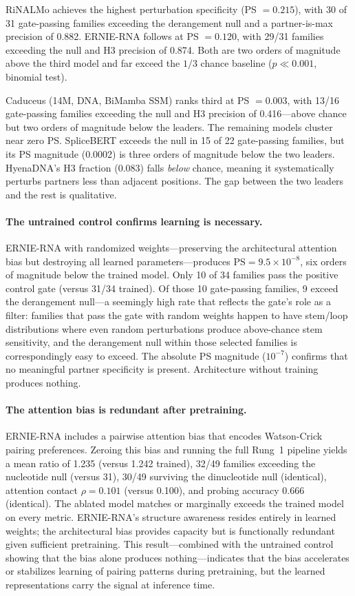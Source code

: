 \documentclass[11pt]{article}
\begin{document}
RiNALMo achieves the highest perturbation specificity (PS $= 0.215$),
with 30 of 31 gate-passing families exceeding the derangement null
and a partner-is-max precision of 0.882.
ERNIE-RNA follows at PS $= 0.120$, with 29/31 families exceeding the
null and H3 precision of 0.874. Both are two orders
of magnitude above the third model and far exceed the
$1/3$ chance baseline ($p \ll 0.001$, binomial test).

Caduceus (14M, DNA, BiMamba SSM) ranks third at PS $= 0.003$, with
13/16 gate-passing families exceeding the null and H3 precision of
0.416---above chance but two orders of magnitude below the leaders.
The remaining models cluster near zero PS. SpliceBERT
exceeds the null in 15 of 22 gate-passing families, but its PS
magnitude (0.0002) is three orders of magnitude below the two
leaders. HyenaDNA's H3 fraction (0.083) falls \emph{below} chance,
meaning it systematically perturbs partners less than adjacent
positions. The gap between the two leaders and the rest is
qualitative.

\paragraph{The untrained control confirms learning is necessary.}
ERNIE-RNA with randomized weights---preserving the architectural
attention bias but destroying all learned parameters---produces
$\text{PS} = 9.5 \times 10^{-8}$, six orders of magnitude below
the trained model. Only 10 of 34 families pass the positive control
gate (versus 31/34 trained). Of those 10 gate-passing families,
9 exceed the derangement null---a seemingly high rate that reflects
the gate's role as a filter: families that pass the gate with random
weights happen to have stem/loop distributions where even random
perturbations produce above-chance stem sensitivity, and the
derangement null within those selected families is correspondingly
easy to exceed. The absolute PS magnitude ($10^{-7}$) confirms that
no meaningful partner specificity is present. Architecture without
training produces nothing.

\paragraph{The attention bias is redundant after pretraining.}
ERNIE-RNA includes a pairwise attention bias that encodes
Watson-Crick pairing preferences. Zeroing this bias and running the
full Rung~1 pipeline yields a mean ratio of 1.235 (versus 1.242
trained), 32/49 families exceeding the nucleotide null (versus 31),
30/49 surviving the dinucleotide null (identical), attention contact
$\rho = 0.101$ (versus 0.100), and probing accuracy 0.666
(identical). The ablated model matches or marginally exceeds the trained model on
every metric. ERNIE-RNA's structure awareness resides entirely in learned
weights; the architectural bias provides capacity but is functionally
redundant given sufficient pretraining. This result---combined with the
untrained control showing that the bias alone produces nothing---indicates
that the bias accelerates or stabilizes learning of pairing patterns
during pretraining, but the learned representations carry the signal
at inference time.
\end{document}

